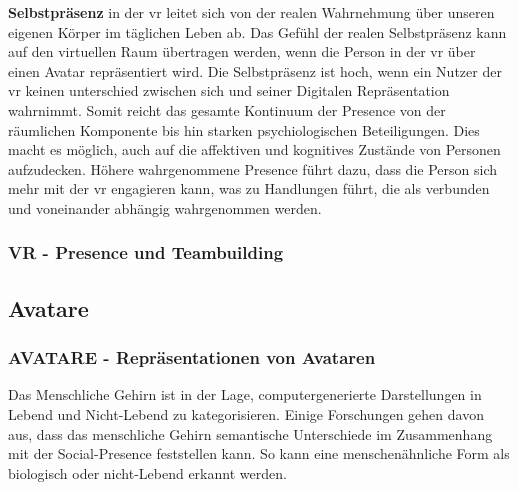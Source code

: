 \documentclass[a4paper,11pt]{article}%
\renewcommand{\\}{\vspace*{0.5\baselineskip} \newline}
\begin{document}
\textbf{Selbstpräsenz} in der \ac{vr} leitet sich von der realen Wahrnehmung über unseren eigenen Körper im täglichen Leben ab. Das Gefühl der realen Selbstpräsenz kann auf den virtuellen Raum übertragen werden, wenn die Person in der \ac{vr} über einen Avatar repräsentiert wird. Die Selbstpräsenz ist hoch, wenn ein Nutzer der \ac{vr} keinen unterschied zwischen sich und seiner Digitalen Repräsentation wahrnimmt. \citep[p.439]{schultze2010embodiment}\\
Somit reicht das gesamte Kontinuum der Presence von der räumlichen Komponente bis hin starken psychiologischen Beteiligungen. Dies macht es möglich, auch auf die affektiven und kognitives Zustände von Personen aufzudecken. Höhere wahrgenommene Presence führt dazu, dass die Person sich mehr mit der \ac{vr} engagieren kann, was zu Handlungen führt, die als verbunden und voneinander abhängig wahrgenommen werden. \citep{biocca2001criteria}
		\subsubsection{VR - Presence und Teambuilding}

\newpage

\subsection{Avatare}
\label{Avatare}
\subsubsection{AVATARE - Repräsentationen von Avataren}

Das Menschliche Gehirn ist in der Lage, computergenerierte Darstellungen in \dq{}Lebend und Nicht-Lebend\dq{} zu kategorisieren. Einige Forschungen gehen davon aus, dass das menschliche Gehirn semantische Unterschiede im Zusammenhang mit der \dq{}Social-Presence\dq{} feststellen kann. So kann eine menschenähnliche Form als biologisch oder nicht-Lebend erkannt werden. 
\end{document}
